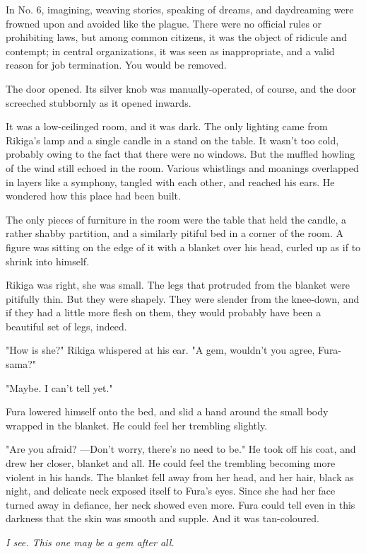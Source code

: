 In No. 6, imagining, weaving stories, speaking of dreams, and
daydreaming were frowned upon and avoided like the plague. There were no
official rules or prohibiting laws, but among common citizens, it was
the object of ridicule and contempt; in central organizations, it was
seen as inappropriate, and a valid reason for job termination. You would
be removed.

The door opened. Its silver knob was manually-operated, of course, and
the door screeched stubbornly as it opened inwards.

It was a low-ceilinged room, and it was dark. The only lighting came
from Rikiga's lamp and a single candle in a stand on the table. It
wasn't too cold, probably owing to the fact that there were no windows.
But the muffled howling of the wind still echoed in the room. Various
whistlings and moanings overlapped in layers like a symphony, tangled
with each other, and reached his ears. He wondered how this place had
been built.

The only pieces of furniture in the room were the table that held the
candle, a rather shabby partition, and a similarly pitiful bed in a
corner of the room. A figure was sitting on the edge of it with a
blanket over his head, curled up as if to shrink into himself.

Rikiga was right, she was small. The legs that protruded from the
blanket were pitifully thin. But they were shapely. They were slender
from the knee-down, and if they had a little more flesh on them, they
would probably have been a beautiful set of legs, indeed.

"How is she?" Rikiga whispered at his ear. "A gem, wouldn't you agree,
Fura-sama?"

"Maybe. I can't tell yet."

Fura lowered himself onto the bed, and slid a hand around the small body
wrapped in the blanket. He could feel her trembling slightly.

"Are you afraid? ---Don't worry, there's no need to be." He took off his
coat, and drew her closer, blanket and all. He could feel the trembling
becoming more violent in his hands. The blanket fell away from her head,
and her hair, black as night, and delicate neck exposed itself to Fura's
eyes. Since she had her face turned away in defiance, her neck showed
even more. Fura could tell even in this darkness that the skin was
smooth and supple. And it was tan-coloured.

\emph{I see. This one may be a gem after all.}

